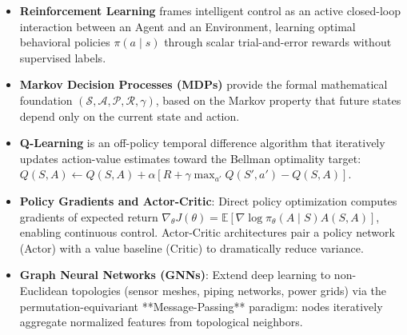 \begin{takeaways}
\begin{itemize}
    \item \textbf{Reinforcement Learning} frames intelligent control as an active closed-loop interaction between an Agent and an Environment, learning optimal behavioral policies $\pi(a \mid s)$ through scalar trial-and-error rewards without supervised labels.
    \item \textbf{Markov Decision Processes (MDPs)} provide the formal mathematical foundation $(\mathcal{S}, \mathcal{A}, \mathcal{P}, \mathcal{R}, \gamma)$, based on the Markov property that future states depend only on the current state and action.
    \item \textbf{Q-Learning} is an off-policy temporal difference algorithm that iteratively updates action-value estimates toward the Bellman optimality target: $Q(S, A) \leftarrow Q(S, A) + \alpha [R + \gamma \max_{a'} Q(S', a') - Q(S, A)]$.
    \item \textbf{Policy Gradients and Actor-Critic}: Direct policy optimization computes gradients of expected return $\nabla_\theta J(\theta) = \mathbb{E}[\nabla \log \pi_\theta(A \mid S) A(S, A)]$, enabling continuous control. Actor-Critic architectures pair a policy network (Actor) with a value baseline (Critic) to dramatically reduce variance.
    \item \textbf{Graph Neural Networks (GNNs)}: Extend deep learning to non-Euclidean topologies (sensor meshes, piping networks, power grids) via the permutation-equivariant **Message-Passing** paradigm: nodes iteratively aggregate normalized features from topological neighbors.
\end{itemize}
\end{takeaways}


